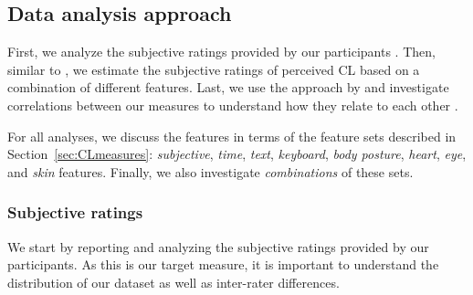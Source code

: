 \documentclass[output=paper]{langsci/langscibook}
\begin{document}
\subsection{Data analysis approach}
First, we analyze the subjective ratings provided by our participants%
.
Then, similar to \citet{herbig2019mt}, we estimate the subjective ratings of perceived CL %
based on a combination of different features.
Last, we use the approach by \citet{vieira2016measures} and investigate correlations between our measures %
to understand how they relate to each other%
.

For all analyses, we discuss the features in terms of the feature sets described in Section~\ref{sec:CLmeasures}: \textit{subjective}, \textit{time}, \textit{text}, \textit{keyboard}, \textit{body posture}, \textit{heart}, \textit{eye}, and \textit{skin} features. Finally, we also investigate \textit{combinations} of these sets.

\subsubsection{Subjective ratings}
\label{sec:SubRate}
We start by reporting and analyzing the subjective ratings provided by our participants. As this is our target measure, it is important to understand the distribution of our dataset as well as inter-rater differences.

\end{document}
